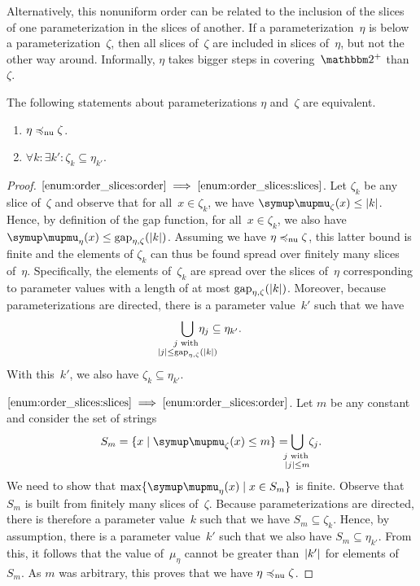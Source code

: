 Alternatively, this nonuniform order can be related to the inclusion of the slices of one parameterization in the slices of another.
If a parameterization~$\eta$ is below a parameterization~$\zeta$, then all slices of~$\zeta$ are included in slices of~$\eta$, but not the other way around.
Informally, $\eta$ takes bigger steps in covering~$\binary^+$ than~$\zeta$.
\begin{lemma}
\label{lem:order_slices}%
  The following statements about parameterizations $\eta$ and~$\zeta$ are equivalent.
  \begin{enumerate}
  \item\label{enum:order_slices:order}
    $\eta \preccurlyeq_\mathrm{nu} \zeta$.
  \item\label{enum:order_slices:slices}
    $\forall k\colon \exists k'\colon \zeta_k \subseteq \eta_{k'}$.
  \end{enumerate}
\end{lemma}
\begin{proof}
$\ref{enum:order_slices:order} \implies \ref{enum:order_slices:slices}$.
  Let $\zeta_k$ be any slice of~$\zeta$ and observe that for all~$x \in \zeta_k$, we have $\mu_\zeta(x) \le \length{k}$.
  Hence, by definition of the gap function, for all~$x \in \zeta_k$, we also have $\mu_\eta(x) \le \gap_{\eta, \zeta}(\length{k})$.
  Assuming we have $\eta \preccurlyeq_\mathrm{nu} \zeta$, this latter bound is finite and the elements of $\zeta_k$ can thus be found spread over finitely many slices of~$\eta$.
  Specifically, the elements of~$\zeta_k$ are spread over the slices of~$\eta$ corresponding to parameter values with a length of at most $\operatorname{gap}_{\eta, \zeta}({\lvert k\rvert})$.
  Moreover, because parameterizations are directed, there is a parameter value~$k'$ such that we have
  \begin{equation*}
    \bigcup_{\mathclap{\substack{j\text{ with } \\ \length{j} \le \gap_{\eta, \zeta}(\length{k})}}}\; \eta_j \subseteq \eta_{k'}.
  \end{equation*}
  With this~$k'$, we also have $\zeta_k \subseteq \eta_{k'}$.

$\ref{enum:order_slices:slices} \implies \ref{enum:order_slices:order}$.
  Let $m$ be any constant and consider the set of strings
  \begin{equation*}
    S_m \deq \{x \st \mu_\zeta(x) \le m\} = \bigcup_{\mathclap{\substack{j\text{ with } \\ \length{j} \le m}}}\; \zeta_j.
  \end{equation*}
  We need to show that $\max \{\mu_\eta(x) \st x \in S_m\}$ is finite.
  Observe that $S_m$ is built from finitely many slices of~$\zeta$.
  Because parameterizations are directed, there is therefore a parameter value~$k$ such that we have $S_m \subseteq \zeta_k$.
  Hence, by assumption, there is a parameter value~$k'$ such that we also have $S_m \subseteq \eta_{k'}$.
  From this, it follows that the value of~$\mu_\eta$ cannot be greater than~${\lvert k'\rvert}$ for elements of~$S_m$.
  As $m$ was arbitrary, this proves that we have $\eta \preccurlyeq_\mathrm{nu} \zeta$.
\end{proof}

